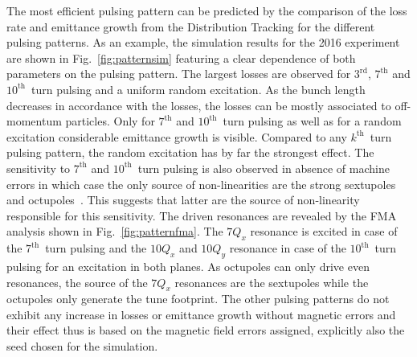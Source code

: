 \documentclass[%
 reprint,
 amsmath,amssymb,
 aps,
prstab,
]{revtex4-1}
\begin{document}
The most efficient pulsing pattern can be predicted by the comparison of the loss rate and emittance growth from the Distribution Tracking for the different pulsing patterns. As an example, the simulation results for the 2016 experiment are shown in Fig.~\ref{fig:patternsim} featuring a clear dependence of both parameters on the pulsing pattern. The largest losses are observed for $3^{\mathrm{rd}}$, $7^{\mathrm{th}}$ and $10^{\mathrm{th}}$~turn pulsing and a uniform random excitation. As the bunch length decreases in accordance with the losses, the losses can be mostly associated to off-momentum particles. Only for $7^{\mathrm{th}}$ and $10^{\mathrm{th}}$~turn pulsing as well as for a random excitation considerable emittance growth is visible. Compared to any $k^{\mathrm{th}}$~turn pulsing pattern, the random excitation has by far the strongest effect. The sensitivity to $7^{\mathrm{th}}$ and $10^{\mathrm{th}}$~turn pulsing is also observed in absence of machine errors in which case the only source of non-linearities are the strong sextupoles and octupoles~\cite{md_sim_hel_res_ex_fitterer}. This suggests that latter are the source of non-linearity responsible for this sensitivity. The driven resonances are revealed by the FMA analysis shown in Fig.~\ref{fig:patternfma}. The $7Q_x$ resonance is excited in case of the $7^{\mathrm{th}}$~turn pulsing and the $10Q_x$ and $10Q_y$ resonance in case of the $10^{\mathrm{th}}$~turn pulsing for an excitation in both planes. As octupoles can only drive even resonances, the source of the $7Q_x$ resonances are the sextupoles while the octupoles only generate the tune footprint. The other pulsing patterns do not exhibit any increase in losses or emittance growth without magnetic errors and their effect thus is based on the magnetic field errors assigned, explicitly also the seed chosen for the simulation.
\end{document}

